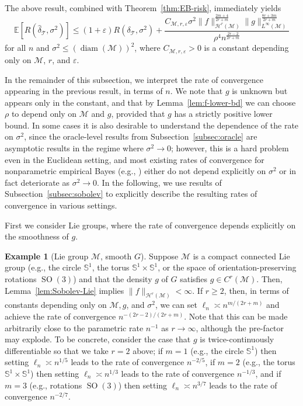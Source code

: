 \documentclass[preprint]{imsart}
\theoremstyle{plain}
\theoremstyle{definition}
\newtheorem{example}[theorem]{Example}
\newcommand{\Ebb}{\mathbb{E}}
\newcommand{\Mcal}{\mathcal{M}}
\newcommand{\Hcal}{\mathcal{H}}
\newcommand{\T}{\mathcal{T}}
\DeclareMathOperator{\diam}{diam}
\DeclareMathOperator{\SO}{SO}
\begin{document}
The above result, combined with Theorem~\ref{thm:EB-risk}, immediately yields
\begin{equation*}
        \Ebb\left[R\left(\hat{\delta}_{\T},\sigma^2\right)\right]\le (1+\varepsilon)R(\delta_{\T},\sigma^2) +\frac{C_{\Mcal,r,\varepsilon}\sigma^{2}\|f\|_{\Hcal^r(\Mcal)}^{\frac{2m+4}{2r+m}}\|g\|_{L^{\infty}(\Mcal)}^{\frac{8r+3m}{2r+m}}}{\rho^{4}n^{\frac{2r-2}{2r+m}}}
    \end{equation*}
    for all $n$ and $\sigma^2\le (\diam(\Mcal))^2$, where $C_{\Mcal,r,\varepsilon}>0$ is a constant depending only on $\Mcal$, $r$, and $\varepsilon$.
    
In the remainder of this subsection, we interpret the rate of convergence appearing in the previous result, in terms of $n$.
We note that $g$ is unknown but appears only in the constant, and that by Lemma~\ref{lem:f-lower-bd} we can choose $\rho$ to depend only on $\Mcal$ and $g$, provided that $g$ has a strictly positive lower bound.
In some cases it is also desirable to understand the dependence of the rate on $\sigma^2$, since the oracle-level results from Subsection~\ref{subsec:oracle} are asymptotic results in the regime where $\sigma^2\to 0$; however, this is a hard problem even in the Euclidean setting, and most existing rates of convergence for nonparametric empirical Bayes (e.g., \cite{Zhang1997, SahaGuntuboyina, Soloff}) either do not depend explicitly on $\sigma^2$ or in fact deteriorate as $\sigma^2\to 0$.
In the following, we use results of Subsection~\ref{subsec:sobolev} to explicitly describe the resulting rates of convergence in various settings.

First we consider Lie groups, where the rate of convergence depends explicitly on the smoothness of $g$.

\begin{example}[Lie group $\Mcal$, smooth $G$]\label{ex:Lie}
    Suppose $\Mcal$ is a compact connected Lie group (e.g., the circle $\mathbb{S}^1$, the torus $\mathbb{S}^1\times\mathbb{S}^1$, or the space of orientation-preserving rotations $\SO(3)$) and that the density $g$ of $G$ satisfies $g\in C^r(\Mcal)$.
    Then, Lemma~\ref{lem:Sobolev-Lie} implies $\|f\|_{\Hcal^r(\Mcal)}<\infty$.
    If $r\ge 2$, then,  in terms of constants depending only on $\Mcal,g$, and $\sigma^2$, we can set $\ell_n \asymp n^{m/(2r+m)}$ and achieve the rate of convergence $n^{-(2r-2)/(2r+m)}$.
    Note that this can be made arbitrarily close to the parametric rate $n^{-1}$ as $r\to\infty$, although the pre-factor may explode.
    To be concrete, consider the case that $g$ is twice-continuously differentiable so that we take $r=2$ above; if $m=1$ (e.g., the circle $\mathbb{S}^1$) then setting $\ell_n\asymp n^{1/5}$ leads to the rate of convergence $n^{-2/5}$, if $m=2$ (e.g., the torus $\mathbb{S}^1\times \mathbb{S}^1$) then setting $\ell_n\asymp n^{1/3}$ leads to the rate of convergence $n^{-1/3}$, and if $m=3$ (e.g., rotations $\SO(3)$) then setting $\ell_n\asymp n^{3/7}$ leads to the rate of convergence $n^{-2/7}$.
\end{example}
\end{document}

